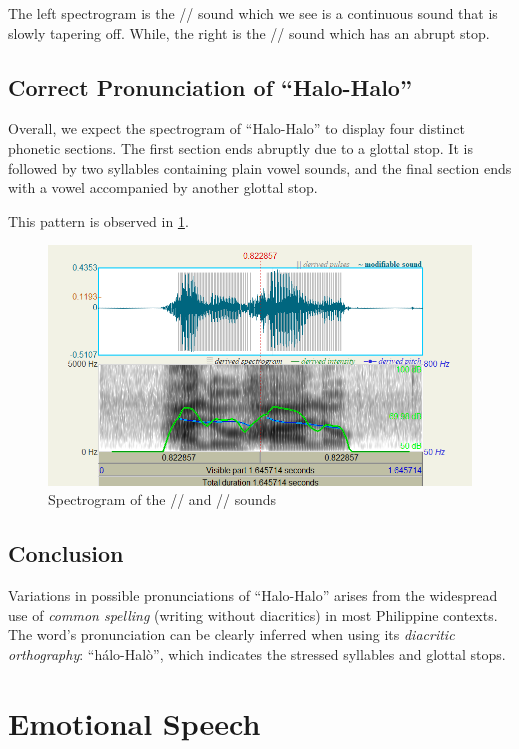 \documentclass{article}
\begin{document}
The left spectrogram is the // sound which we see is a continuous
sound that is slowly tapering off. While, the right is the // sound
which has an abrupt stop.

\subsection{Correct Pronunciation of ``Halo-Halo''}
Overall, we expect the spectrogram of ``Halo-Halo'' to display four distinct
phonetic sections. The first section ends abruptly due to a glottal stop. It is
followed by two syllables containing plain vowel sounds, and the final section
ends with a vowel accompanied by another glottal stop.

This pattern is observed in \cref{fig:correct}.

\begin{figure}
    \centering
    \includegraphics[width=0.65\linewidth]{img/correct.png}
    \caption{Spectrogram of the // and // sounds}\label{fig:correct}
\end{figure}

\subsection{Conclusion}

Variations in possible pronunciations of ``Halo-Halo'' arises from the
widespread use of \emph{common spelling} (writing without diacritics) in most
Philippine contexts. The word's pronunciation can be clearly inferred when
using its \emph{diacritic orthography}: ``h\'alo-Hal\`o'', which indicates the
stressed syllables and glottal stops.

\section{Emotional Speech}



\end{document}
